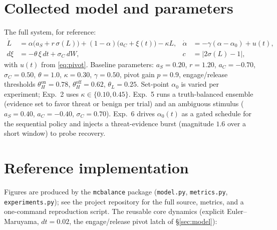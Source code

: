 \documentclass[11pt]{article}
\newcommand{\sig}{\sigma}
\begin{document}
\appendix
\section{Collected model and parameters}
\label{app:params}
The full system, for reference:
\begin{align*}
\dot L &= \alpha\big(a_S + r\,\sig(L)\big) + (1-\alpha)\big(a_C+\xi(t)\big) - \kappa L, &
\dot\alpha &= -\gamma(\alpha-\alpha_0) + u(t),\\
d\xi &= -\theta\,\xi\,dt + \sigma_C\,dW, &
c &= |2\sig(L)-1|,
\end{align*}
with $u(t)$ from \eqref{eq:pivot}. Baseline parameters:
$a_S=0.20$, $r=1.20$, $a_C=-0.70$, $\sigma_C=0.50$, $\theta=1.0$, $\kappa=0.30$, $\gamma=0.50$, pivot gain $p=0.9$, engage/release thresholds $\theta_H^{\text{on}}=0.78$, $\theta_H^{\text{off}}=0.62$, $\theta_L=0.25$. Set-point $\alpha_0$ is varied per experiment; Exp.~2 uses $\kappa\in\{0.10,0.45\}$. Exp.~5 runs a truth-balanced ensemble (evidence set to favor threat or benign per trial) and an ambiguous stimulus ($a_S=0.40$, $a_C=-0.40$, $\sigma_C=0.70$). Exp.~6 drives $\alpha_0(t)$ as a gated schedule for the sequential policy and injects a threat-evidence burst (magnitude $1.6$ over a short window) to probe recovery.

\section{Reference implementation}
\label{app:code}
Figures are produced by the \texttt{mcbalance} package (\texttt{model.py}, \texttt{metrics.py}, \texttt{experiments.py}); see the project repository for the full source, metrics, and a one-command reproduction script. The reusable core dynamics (explicit Euler--Maruyama, $dt=0.02$, the engage/release pivot latch of \S\ref{sec:model}):




\end{document}
